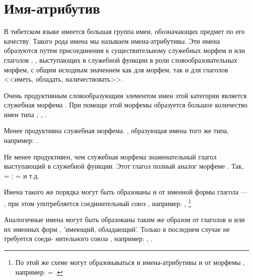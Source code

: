 \section{Имя-атрибутив}

В тибетском языке имеется большая группа имен, обозначающих предмет по его качеству. Такого рода имена мы называем имена-атрибутивы. Эти имена образуются путем присоединения к существительному служебных морфем  и  или глаголов , ,  выступающих в служебной функции в роли словообразовательных морфем, с общим исходным значением
как для морфем, так и для глаголов <<иметь, обладать, наличествовать>>.

Очень продуктивным словообразующим элементом имен этой категории является служебная морфема	. При помощи этой морфемы образуется большое количество имен типа , , .

Менее продуктивна служебная морфема. , образующая имена того же типа, например: .

Не менее продуктивен, чем служебная морфема  знаменательный глагол  выступающий в служебной функции. Этот глагол полный аналог морфеме . Так,  = ;
 =  и т.д.

Имена такого же порядка могут быть образованы и от именной формы глагола  --- ,
при этом употребляется соединительный союз , например:
, \footnote[31]{
    По этой же схеме могут образовываться и имена-атрибутивы и от морфемы , например:
     = .
}

Аналогичные имена могут быть образованы таким же образом от глаголов  и  или их именных форм ,  'имеющий, обладающий'. Только в последнем случае не требуется соеди-
нительного союза , например:
, .

